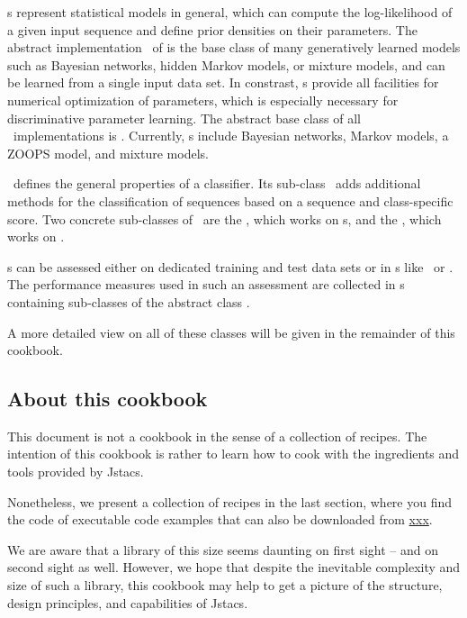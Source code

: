 \StatMod s represent statistical models in general, which can compute the log-likelihood of a given input sequence and define prior densities on their parameters. The abstract implementation \AbstractTrainSM~of \TrainSM is the base class of many generatively learned models such as Bayesian networks, hidden Markov models, or mixture models, and can be learned from a single input data set. In constrast, \DiffSM s provide all facilities for numerical optimization of parameters, which is especially necessary for discriminative parameter learning. The abstract base class of all \DiffSM~implementations is \AbstractDiffSM. Currently, \DiffSM s include Bayesian networks, Markov models, a ZOOPS model, and mixture models.

\AbstractClassifier~defines the general properties of a classifier. Its sub-class \AbstractScoreBasedClassifier~adds additional methods for the classification of sequences based on a sequence and class-specific score.
Two concrete sub-classes of \AbstractScoreBasedClassifier~are the \TrainSMBasedClassifier, which works on \TrainSM s, and the \GenDisMixClassifier, which works on \DiffSM.

\AbstractClassifier s can be assessed either on dedicated training and test data sets or in \ClassifierAssessment s like \KFoldCrossValidation~or \RepeatedHoldOutExperiment. The performance measures used in such an assessment are collected in \PerformanceMeasureParameterSet s containing sub-classes of the abstract class \AbstractPerformanceMeasure.

A more detailed view on all of these classes will be given in the remainder of this cookbook.

\subsection{About this cookbook}

This document is not a cookbook in the sense of a collection of recipes. The intention of this cookbook is rather to learn how to cook with the ingredients and tools provided by Jstacs.

Nonetheless, we present a collection of recipes in the last section, where you find the code of executable code examples that can also be downloaded from \url{xxx}.

We are aware that a library of this size seems daunting on first sight -- and on second sight as well. However, we hope that despite the inevitable complexity and size of such a library, this cookbook may help to get a picture of the structure, design principles, and capabilities of Jstacs.

